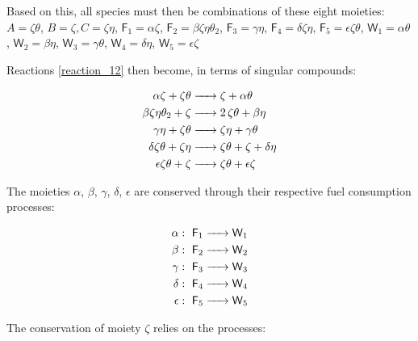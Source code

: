 \documentclass{article}
\begin{document}
Based on this, all species must then be combinations of these eight moieties:
$A = \zeta \theta$, $B = \zeta, C =  \zeta \eta$,
$\textsf{F}_1  = \alpha \zeta$,
$\textsf{F}_2  = \beta \zeta \eta \theta_2$,
$\textsf{F}_3  = \gamma \eta$,
$\textsf{F}_4  = \delta \zeta \eta$,
$\textsf{F}_5  = \epsilon \zeta \theta$,
$\textsf{W}_1  = \alpha \theta$,
$\textsf{W}_2  = \beta \eta$,
$\textsf{W}_3  = \gamma \theta$,
$\textsf{W}_4  = \delta \eta$,
$\textsf{W}_5  = \epsilon \zeta$

Reactions \ref{reaction_12} then become, in terms of singular compounds:

\begin{equation}
\label{cc}
		\begin{split}
		\ce{\textsf{$\alpha \zeta$} + \textsf{$\zeta \theta$}& -> \textsf{$\zeta$} + \textsf{$\alpha \theta$} } \\ 
\ce{\textsf{$\beta \zeta \eta \theta_2$} + \textsf{$\zeta$}& -> 2 \textsf{$\zeta \theta$} + \textsf{$\beta \eta$} } \\ 
\ce{\textsf{$\gamma \eta$} + \textsf{$\zeta \theta$}& -> \textsf{$\zeta \eta$} + \textsf{$\gamma \theta$} } \\
\ce{\textsf{$\delta \zeta \theta$} + \textsf{$\zeta \eta$}& -> \textsf{$\zeta \theta$} + \textsf{$\zeta$} + \textsf{$\delta \eta$} } \\
\ce{\textsf{$\epsilon \zeta \theta$} + \textsf{$\zeta$}& -> \textsf{$\zeta \theta$} + \textsf{$\epsilon \zeta$} } \\ 
		\end{split} 
\end{equation}

The moieties $\alpha$, $\beta$, $\gamma$, $\delta$, $\epsilon$ are conserved through their respective fuel consumption processes:

\begin{equation}\label{reaction_12}
		\begin{split}
  \alpha : \ \ce{\textsf{F}_1 & -> \textsf{W}_1 }	\\
  \beta : \ \ce{\textsf{F}_2 & -> \textsf{W}_2 }	\\
  \gamma : \ \ce{\textsf{F}_3 & -> \textsf{W}_3 }	\\
  \delta : \ \ce{\textsf{F}_4 & -> \textsf{W}_4 }	\\
  \epsilon : \ \ce{\textsf{F}_5 & -> \textsf{W}_5 }
		\end{split} 
\end{equation}

The conservation of moiety $\zeta$ relies on the processes:
\end{document}
